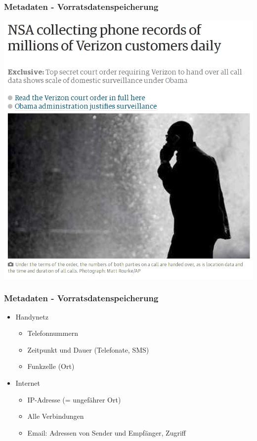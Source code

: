 \documentclass[12pt, xcolor={svgnames,table}]{beamer}
\begin{document}
\begin{frame}
  \frametitle{Metadaten - Vorratsdatenspeicherung}
  \begin{center}
    \includegraphics[height=0.7\textheight]{img/vds-verizon.png}
  \end{center}
\end{frame}

\begin{frame}
  \frametitle{Metadaten - Vorratsdatenspeicherung}
  \begin{itemize}
    \item Handynetz
      \begin{itemize}
        \item Telefonnummern
        \item Zeitpunkt und Dauer (Telefonate, SMS)
        \item Funkzelle (Ort)
      \end{itemize}
    \item Internet
      \begin{itemize}
        \item IP-Adresse (= ungefährer Ort)
        \item Alle Verbindungen
        \item Email: Adressen von Sender und Empfänger, Zugriff
      \end{itemize}
  \end{itemize}
\end{frame}
\end{document}
